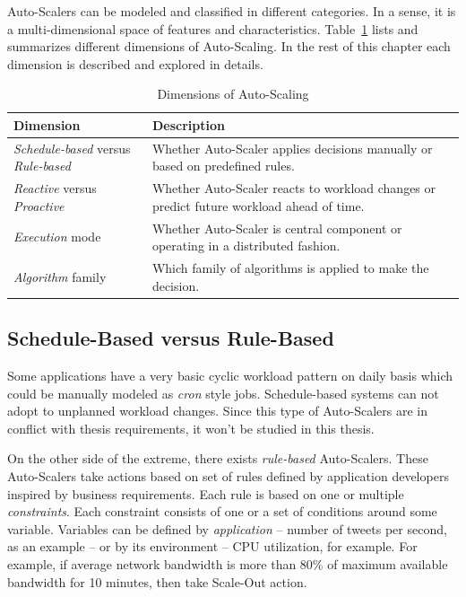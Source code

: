 Auto-Scalers can be modeled and classified in different categories. In a sense, it is a multi-dimensional space of features and characteristics. Table~\ref{tab:taxonomy-sum} lists and summarizes different dimensions of Auto-Scaling. In the rest of this chapter each dimension is described and explored in details.
\begin{table}[h!]
    \begin{tabularx}{\textwidth}{lX}
        \toprule
        \textbf{Dimension} & \textbf{Description}\\
        \midrule
        \emph{Schedule-based} versus \emph{Rule-based} & Whether Auto-Scaler applies decisions manually or based on predefined rules.\\
        \emph{Reactive} versus \emph{Proactive} & Whether Auto-Scaler reacts to workload changes or predict future workload ahead of time.\\
        \emph{Execution} mode & Whether Auto-Scaler is central component or operating in a distributed fashion.\\
        \emph{Algorithm} family & Which family of algorithms is applied to make the decision.\\
        \bottomrule
    \end{tabularx}
    \centering
    \caption{Dimensions of Auto-Scaling}
    \label{tab:taxonomy-sum}
\end{table}
\subsection{Schedule-Based versus Rule-Based}
\label{ias:sched-rule}

Some applications have a very basic cyclic workload pattern on daily basis which could be manually modeled as \emph{cron} style jobs. Schedule-based systems can not adopt to unplanned workload changes. Since this type of Auto-Scalers are in conflict with thesis requirements, it won't be studied in this thesis.

On the other side of the extreme, there exists \emph{rule-based} Auto-Scalers. These Auto-Scalers take actions based on set of rules defined by application developers inspired by business requirements. Each rule is based on one or multiple \emph{constraints}. Each constraint consists of one or a set of conditions around some variable. Variables can be defined by \emph{application} -- number of tweets per second, as an example -- or by its environment -- CPU utilization, for example. For example, if average network bandwidth is more than 80\% of maximum available bandwidth for 10 minutes, then take Scale-Out action.

